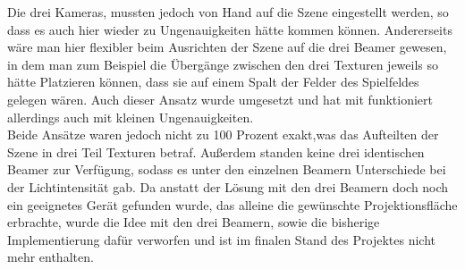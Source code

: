 Die drei Kameras, mussten jedoch von Hand auf die Szene eingestellt werden, so dass es auch hier wieder zu Ungenauigkeiten hätte kommen können. Andererseits wäre man hier flexibler beim Ausrichten der Szene auf die drei Beamer gewesen, in dem man zum Beispiel die Übergänge zwischen den drei Texturen jeweils so hätte Platzieren können, dass sie auf einem Spalt der Felder des Spielfeldes gelegen wären. Auch dieser Ansatz wurde umgesetzt und hat mit funktioniert allerdings auch mit kleinen Ungenauigkeiten.\\
Beide Ansätze waren jedoch nicht zu 100 Prozent exakt,was das Aufteilten der Szene in drei Teil Texturen betraf. Außerdem standen keine drei identischen Beamer zur Verfügung, sodass es unter den einzelnen Beamern Unterschiede bei der Lichtintensität gab.
Da anstatt der Lösung mit den drei Beamern doch noch ein geeignetes Gerät gefunden wurde, das alleine die gewünschte Projektionsfläche erbrachte, wurde die Idee mit den drei Beamern, sowie die bisherige Implementierung dafür verworfen und ist im finalen Stand des Projektes nicht mehr enthalten.\\